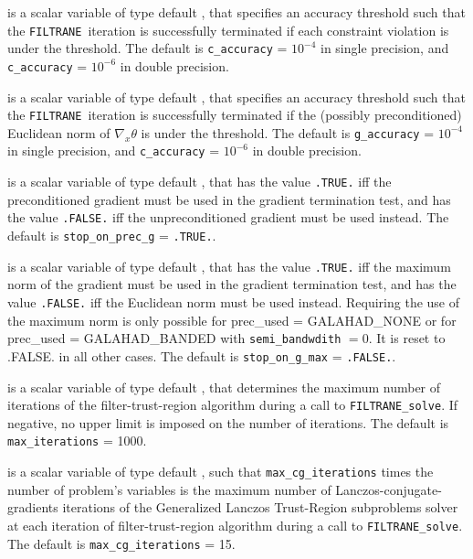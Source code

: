 \documentclass{galahad}
\newcommand{\packagename}{FILTRANE}
\newcommand{\sym}{\sf\small}
\newcommand{\filtrane}{{\tt \packagename}}
\begin{document}
\begin{description}
 is a scalar variable of type default \realdp, that
specifies an accuracy threshold such that the \filtrane\ iteration is
successfully terminated if each constraint violation is under the threshold.
The default is {\tt c\_accuracy} = $10^{-4}$ in single precision, and
{\tt c\_accuracy} = $10^{-6}$ in double precision.

 is a scalar variable of type default \realdp, that
specifies an accuracy threshold such that the \filtrane\ iteration is
successfully terminated if the (possibly preconditioned) Euclidean norm
of $\nabla_x \theta$ is under the threshold.
The default is {\tt g\_accuracy} = $10^{-4}$ in single precision, and
{\tt c\_accuracy} = $10^{-6}$ in double precision.

 is a scalar variable of type default \logical, that
has the value {\tt .TRUE.} iff the preconditioned gradient must be used
in the gradient termination test, and has the value {\tt .FALSE.} iff the
unpreconditioned gradient must be used instead.
The default is {\tt stop\_on\_prec\_g} = {\tt .TRUE.}.

 is a scalar variable of type default \logical, that
has the value {\tt .TRUE.} iff the maximum norm of the gradient must be used
in the gradient termination test, and has the value {\tt .FALSE.} iff the
Euclidean norm must be used instead. Requiring the use of the maximum norm
is only possible for {prec\_used} = {\sym GALAHAD\_NONE} or for
{prec\_used} = {\sym GALAHAD\_BANDED} with {\tt semi\_bandwdith} $= 0$.  It is
reset to .FALSE. in all other cases.
The default is {\tt stop\_on\_g\_max} = {\tt .FALSE.}.

 is a scalar variable of type default \integer, that
determines the maximum number of iterations of the filter-trust-region
algorithm during a call to {\tt \packagename\_solve}. If negative, no upper
limit is imposed on the number of iterations.
The default is {\tt max\_iterations} = 1000.

 is a scalar variable of type default \integer, such
that {\tt max\_cg\_iterations} times the number of problem's variables
is the maximum number of Lanczos-conjugate-gradients iterations of the
Generalized Lanczos Trust-Region subproblems solver at each iteration of
filter-trust-region algorithm during a call to {\tt \packagename\_solve}.
The default is {\tt max\_cg\_iterations} = 15.


\end{description}
\end{document}
